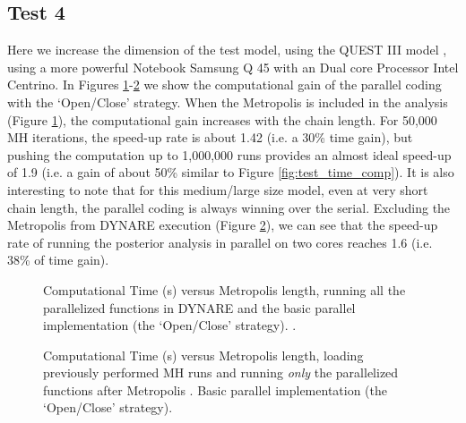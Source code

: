 \documentclass[12pt,a4paper,pdftex]{article}
\begin{document}
\subsection{Test 4}\label{s:test4}
Here we increase the dimension of the test model, using the QUEST III model \citep{Ratto_et_al_EconModel2009}, using a more powerful Notebook Samsung Q 45 with an Dual core Processor Intel Centrino. In Figures \ref{fig:quest_complete_openclose}-\ref{fig:quest_partial_openclose} we show the computational gain of the parallel coding with the `Open/Close' strategy. When the Metropolis is included in the analysis (Figure \ref{fig:quest_complete_openclose}), the computational gain increases with the chain length. For 50,000 MH iterations, the speed-up rate is about 1.42 (i.e. a 30\% time gain), but pushing the computation up to 1,000,000 runs provides an almost ideal speed-up of 1.9 (i.e. a gain of about 50\% similar to Figure \ref{fig:test_time_comp}).
It is also interesting to note that for this medium/large size model, even at very short chain length, the parallel coding is always winning over the serial. Excluding the Metropolis from DYNARE execution (Figure \ref{fig:quest_partial_openclose}), we can see that the speed-up rate of running the posterior analysis in parallel on two cores reaches 1.6 (i.e. 38\% of time gain).
\begin{figure}[!ht]
\begin{centering}
  \epsfxsize=300pt 
  \caption{Computational Time (s) versus Metropolis length, running all the parallelized functions in DYNARE and the basic parallel implementation (the `Open/Close' strategy). \citep{Ratto_et_al_EconModel2009}.}\label{fig:quest_complete_openclose}
\end{centering}
\end{figure}
\begin{figure}[!hb]
\begin{centering}
  \epsfxsize=300pt 
  \caption{Computational Time (s) versus Metropolis length, loading previously performed MH runs and running \emph{only} the parallelized functions after Metropolis \citep{Ratto_et_al_EconModel2009}. Basic parallel implementation (the `Open/Close' strategy).}\label{fig:quest_partial_openclose}
\end{centering}
\end{figure}
\end{document}
